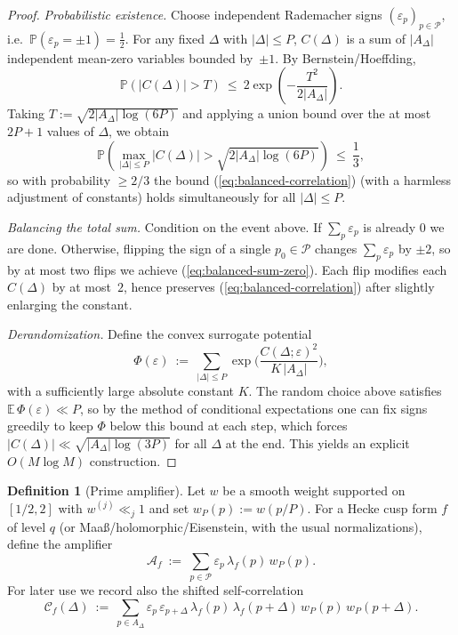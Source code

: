 \documentclass[11pt]{article}
\def\eqref#1{(\ref{#1})}%
\theoremstyle{definition}
\newtheorem{definition}[lemma]{Definition}
\theoremstyle{remark}
\numberwithin{equation}{part}
\begin{document}
\begin{proof}
	\emph{Probabilistic existence.}
	Choose independent Rademacher signs $(\varepsilon_p)_{p\in\mathcal P}$, i.e.\ $\mathbb P(\varepsilon_p=\pm1)=\tfrac12$.
	For any fixed $\Delta$ with $|\Delta|\le P$, $C(\Delta)$ is a sum of $|A_\Delta|$ independent mean-zero variables bounded by~$\pm1$.
	By Bernstein/Hoeffding,
	\[
		\mathbb P\!\left(|C(\Delta)|>T\right)\ \le\ 2\exp\!\left(-\frac{T^2}{2|A_\Delta|}\right).
	\]
	Taking $T:=\sqrt{2|A_\Delta|\log(6P)}$ and applying a union bound over the at most $2P+1$ values of $\Delta$, we obtain
	\[
		\mathbb P\!\left(\max_{|\Delta|\le P}|C(\Delta)|> \sqrt{2|A_\Delta|\log(6P)}\right)
		\ \le\ \frac{1}{3},
	\]
	so with probability $\ge 2/3$ the bound \eqref{eq:balanced-correlation} (with a harmless adjustment of constants) holds simultaneously for all $|\Delta|\le P$.

	\emph{Balancing the total sum.}
	Condition on the event above. If $\sum_{p}\varepsilon_p$ is already $0$ we are done.
	Otherwise, flipping the sign of a single $p_0\in\mathcal P$ changes $\sum_p\varepsilon_p$ by $\pm2$, so by at most two flips we achieve \eqref{eq:balanced-sum-zero}.
	Each flip modifies each $C(\Delta)$ by at most~$2$, hence preserves \eqref{eq:balanced-correlation} after slightly enlarging the constant.

	\emph{Derandomization.}
	Define the convex surrogate potential
	\[
		\Phi(\varepsilon)\ :=\ \sum_{|\Delta|\le P}\exp\!\Big(\frac{C(\Delta;\varepsilon)^2}{K\,|A_\Delta|}\Big),
	\]
	with a sufficiently large absolute constant $K$.
	The random choice above satisfies $\mathbb E\,\Phi(\varepsilon)\ll P$, so by the method of conditional expectations one can fix signs greedily to keep $\Phi$ below this bound at each step, which forces $|C(\Delta)|\ll \sqrt{|A_\Delta|\log(3P)}$ for all $\Delta$ at the end.
	This yields an explicit $O(M\log M)$ construction.
\end{proof}

\begin{definition}[Prime amplifier]\label{def:amplifier}
	Let $w$ be a smooth weight supported on $[1/2,2]$ with $w^{(j)}\ll_j 1$ and set $w_P(p):=w(p/P)$.
	For a Hecke cusp form $f$ of level $q$ (or Maaß/holomorphic/Eisenstein, with the usual normalizations), define the amplifier
	\[
		\mathcal A_f\ :=\ \sum_{p\in\mathcal P}\varepsilon_p\,\lambda_f(p)\,w_P(p).
	\]
	For later use we record also the shifted self-correlation
	\[
		\mathcal C_f(\Delta)\ :=\ \sum_{p\in A_\Delta}\varepsilon_p\,\varepsilon_{p+\Delta}\,
		\lambda_f(p)\,\lambda_f(p+\Delta)\,w_P(p)\,w_P(p+\Delta).
	\]
\end{definition}
\end{document}
